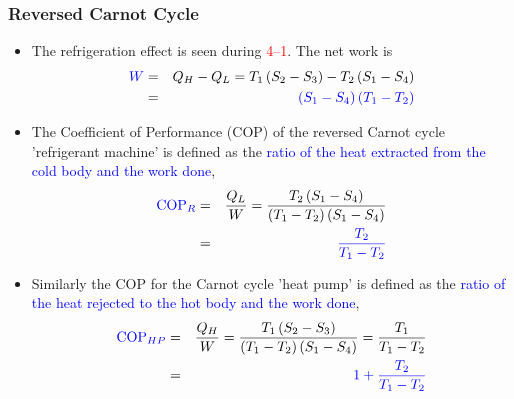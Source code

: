 \documentclass[10pt,compress]{beamer}
\newcommand{\frc}{\displaystyle\frac}
\begin{document}
\begin{frame}
 \frametitle{Reversed Carnot Cycle}

    \begin{itemize}

     \item <1-> The refrigeration effect is seen during \textcolor{red}{4--1}. The net work is
      \begin{eqnarray}
        \textcolor{blue}{W} &=& Q_{H}- Q_{L} = T_{1}\left(S_{2}-S_{3}\right)-T_{2}\left(S_{1}-S_{4}\right)\nonumber \\
        &=& \textcolor{blue}{\left(S_{1}-S_{4}\right)\left(T_{1}-T_{2}\right)} \nonumber
     \end{eqnarray}

     \item <2-> The Coefficient of Performance (COP) of the reversed Carnot cycle 'refrigerant machine' is defined as the \textcolor{blue}{ratio of the heat extracted from the cold body and the work done}, 
        \begin{eqnarray}
         \textcolor{blue}{\text{COP}_{R}} &=& \frc{Q_{L}}{W} = \frc{T_{2}\left(S_{1}-S_{4}\right)}{\left(T_{1}-T_{2}\right)\left(S_{1}-S_{4}\right)} \nonumber \\
                    &=&\textcolor{blue}{ \frc{T_{2}}{T_{1}-T_{2}} }\nonumber 
        \end{eqnarray}

     \item <3-> Similarly the COP for the Carnot cycle 'heat pump' is defined as the \textcolor{blue}{ratio of the heat rejected to the hot body and the work done}, 
        \begin{eqnarray}
         \textcolor{blue}{\text{COP}_{HP}} &=& \frc{Q_{H}}{W} =\frc{T_{1}\left(S_{2}-S_{3}\right)}{\left(T_{1}-T_{2}\right)\left(S_{1}-S_{4}\right)} = \frc{T_{1}}{T_{1}-T_{2}} \nonumber \\
                    &=& \textcolor{blue}{1 + \frc{T_{2}}{T_{1}-T_{2}}} \nonumber 
        \end{eqnarray}


    \end{itemize}
\end{frame}
\end{document}
